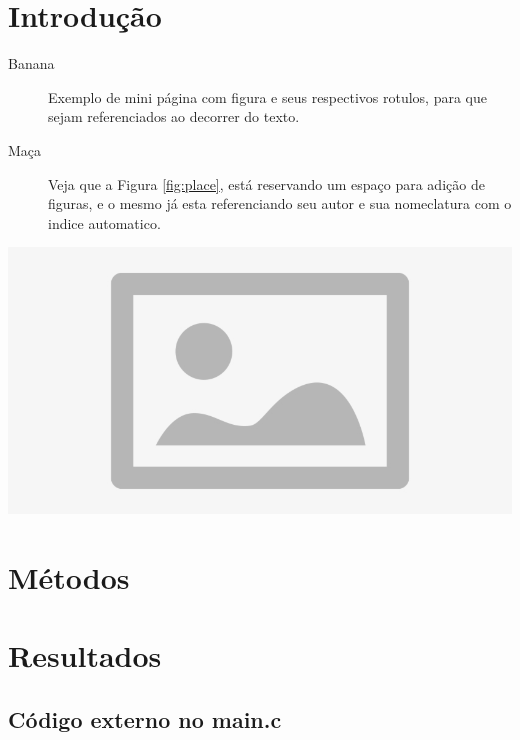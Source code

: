 
\section{Introdução}


\noindent \begin{minipage}[c]{0.6\textwidth}
  \vspace {1cm}
  \begin{description}
    \item [Banana] Exemplo de mini página com figura e seus respectivos rotulos, para que sejam referenciados ao decorrer do texto.
    \item [Maça] Veja que a Figura \ref{fig:place}, está reservando um espaço para adição de figuras, e o mesmo já esta referenciando seu autor e sua nomeclatura com o indice automatico.
  \end{description}

\end{minipage}
\begin{minipage}[c]{0.4\textwidth}

  \includegraphics[width=\textwidth]{figure/placeholder.jpg}
  	\label{fig:place}
\end{minipage}


\section{Métodos}


\section{Resultados}






\subsection{Código externo no main.c}

